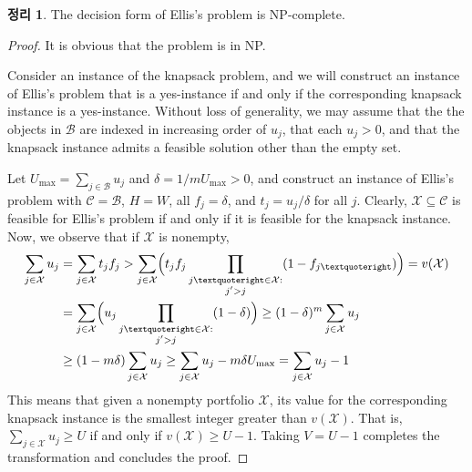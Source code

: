 \documentclass[12pt]{article} %
\newtheorem{theorem}{Theorem}
\theoremstyle{definition}
\newtheorem{theorem}{정리}
\theoremstyle{definition}
\begin{document}
\begin{theorem}
The decision form of Ellis’s problem is NP-complete.
\end{theorem}

\begin{proof}It is obvious that the problem is in NP.

Consider an instance of the knapsack problem, and we will construct an instance of Ellis’s problem that is a yes-instance if and only if the corresponding knapsack instance is a yes-instance. Without loss of generality, we may assume that the the objects in $\mathcal{B}$ are indexed in increasing order of $u_j$, that each $u_j >0$, and that the knapsack instance admits a feasible solution other than the empty set. 

Let $U_{\mathrm{max}} = \sum_{j \in \mathcal{B}} u_j$ and $\delta = {1} /{m U_{\mathrm{max}}} > 0$, and construct an instance of Ellis’s problem with $\mathcal{C} = \mathcal{B}$, $H = W$, all $f_j = \delta$, and $t_j = u_j / \delta$ for all $j$. Clearly, $\mathcal{X} \subseteq \mathcal{C}$ is feasible for Ellis’s problem if and only if it is feasible for the knapsack instance. Now, we observe that if $\mathcal{X}$ is nonempty,
\begin{align}
\begin{split}
\sum_{j \in \mathcal{X}} u_j &=  \sum_{j \in \mathcal{X}} t_j f_j 
> \sum_{j \in \mathcal{X}} \Bigl( t_j f_j  \prod_{\substack{j’ \in \mathcal{X}: \\ j' > j}} (1 - f_{j’}) \Bigr)
= v(\mathcal{X}) \\
&= \sum_{j \in \mathcal{X}} \Bigl( u_j  \prod_{\substack{j’ \in \mathcal{X}: \\ j' > j}} (1 - \delta) \Bigr)
\geq (1 - \delta)^m \sum_{j \in \mathcal{X}} u_j \\
&\geq (1 - m\delta) \sum_{j \in \mathcal{X}} u_j 
\geq \sum_{j \in \mathcal{X}} u_j  - m\delta U_{\mathrm{max}}
= \sum_{j \in \mathcal{X}} u_j  - 1
\end{split}
\end{align}
This means that given a nonempty portfolio $\mathcal{X}$, its value for the corresponding knapsack instance is the smallest integer greater than $v( \mathcal{X})$. That is, $\sum_{j \in \mathcal{X}} u_j \geq U$ if and only if $v(\mathcal{X}) \geq U -1$. Taking $V = U-1$ completes the transformation and concludes the proof.  \end{proof}
\end{document}
